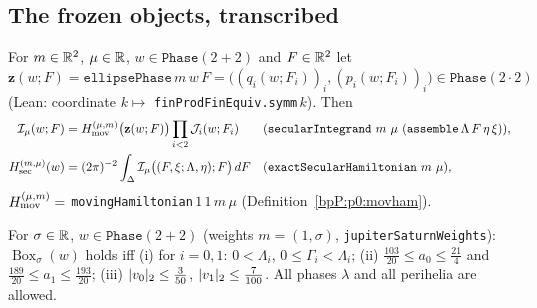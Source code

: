 \subsection{The frozen objects, transcribed}\label{bpP:p14:sb-frozen}

\begin{definition}\label{bpP:p14:sb-defs}
For $m\in\mathbb{R}^2$, $\mu\in\mathbb{R}$, $w\in\texttt{Phase}(2+2)$ and $F\in\mathbb{R}^2$ let $\mathbf z(w;F)=\texttt{ellipsePhase}\,m\,w\,F=\bigl((q_i(w;F_i))_i,(p_i(w;F_i))_i\bigr)\in\texttt{Phase}(2\cdot2)$ (Lean: coordinate $k\mapsto$ \texttt{finProdFinEquiv.symm}\,$k$). Then
\begin{align*}
\mathcal I_\mu(w;F)&=H_{\rm mov}^{(\mu,m)}\bigl(\mathbf z(w;F)\bigr)\prod_{i<2}\mathcal J_i(w;F_i)&&(\texttt{secularIntegrand}\ m\ \mu\ (\texttt{assemble}\,\Lambda\,F\,\eta\,\xi)),\\
H_{\rm sec}^{(m,\mu)}(w)&=(2\pi)^{-2}\int_\Delta\mathcal I_\mu\bigl((F,\xi;\Lambda,\eta);F\bigr)\,dF&&(\texttt{exactSecularHamiltonian}\ m\ \mu),
\end{align*}
$H_{\rm mov}^{(\mu,m)}=$ \texttt{movingHamiltonian}\,$1\,1\,m\,\mu$ (Definition~\ref{bpP:p0:movham}).
\end{definition}

\begin{definition}\label{bpP:p14:sb-box}
For $\sigma\in\mathbb{R}$, $w\in\texttt{Phase}(2+2)$ (weights $m=(1,\sigma)$, \texttt{jupiterSaturnWeights}): $\operatorname{Box}_\sigma(w)$ holds iff
(i) for $i=0,1$: $0<\Lambda_i$, $0\le\Gamma_i<\Lambda_i$; (ii) $\frac{103}{20}\le a_0\le\frac{21}4$ and $\frac{189}{20}\le a_1\le\frac{193}{20}$; (iii) $\lvert v_0\rvert_2\le\frac3{50}$, $\lvert v_1\rvert_2\le\frac7{100}$.
All phases $\lambda$ and all perihelia are allowed.
\end{definition}

